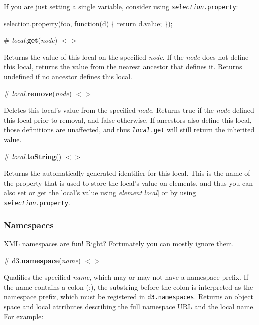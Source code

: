 If you are just setting a single variable, consider using \href{#selection_property}{\tt {\itshape selection}.property}\+:


\begin{DoxyCode}
selection.property(foo, function(d) \{ return d.value; \});
\end{DoxyCode}


\label{_local_get}%
\# {\itshape local}.{\bfseries get}({\itshape node}) \href{https://github.com/d3/d3-selection/blob/master/src/local.js#L13}{\tt $<$$>$}

Returns the value of this local on the specified {\itshape node}. If the {\itshape node} does not define this local, returns the value from the nearest ancestor that defines it. Returns undefined if no ancestor defines this local.

\label{_local_remove}%
\# {\itshape local}.{\bfseries remove}({\itshape node}) \href{https://github.com/d3/d3-selection/blob/master/src/local.js#L21}{\tt $<$$>$}

Deletes this local’s value from the specified {\itshape node}. Returns true if the {\itshape node} defined this local prior to removal, and false otherwise. If ancestors also define this local, those definitions are unaffected, and thus \href{#local_get}{\tt {\itshape local}.get} will still return the inherited value.

\label{_local_toString}%
\# {\itshape local}.{\bfseries to\+String}() \href{https://github.com/d3/d3-selection/blob/master/src/local.js#L24}{\tt $<$$>$}

Returns the automatically-\/generated identifier for this local. This is the name of the property that is used to store the local’s value on elements, and thus you can also set or get the local’s value using {\itshape element}\mbox{[}{\itshape local}\mbox{]} or by using \href{#selection_property}{\tt {\itshape selection}.property}.

\subsubsection*{Namespaces}

X\+ML namespaces are fun! Right? Fortunately you can mostly ignore them.

\label{_namespace}%
\# d3.{\bfseries namespace}({\itshape name}) \href{https://github.com/d3/d3-selection/blob/master/src/namespace.js}{\tt $<$$>$}

Qualifies the specified {\itshape name}, which may or may not have a namespace prefix. If the name contains a colon ({\ttfamily \+:}), the substring before the colon is interpreted as the namespace prefix, which must be registered in \href{#namespaces}{\tt d3.\+namespaces}. Returns an object {\ttfamily space} and {\ttfamily local} attributes describing the full namespace U\+RL and the local name. For example\+:



